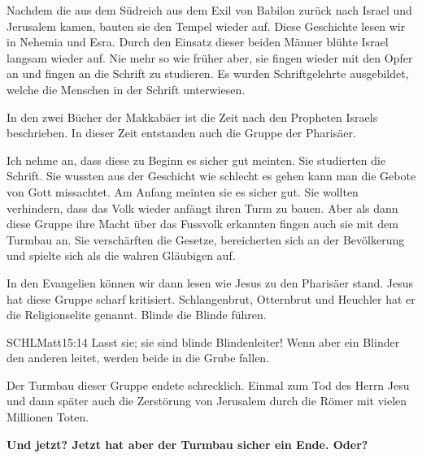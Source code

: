 \documentclass[14pt]{../../inc/mybib}
\newenvironment{block}[1][]{%
  \vspace{1.5em}%
  \noindent\textbf{#1}\par%
  \vspace{0.0em}%
}{%
  \vspace{1em}%
}
\begin{document}
\begin{block}
    Nachdem die aus dem Südreich aus dem Exil von Babilon zurück nach Israel und Jerusalem kamen, bauten sie den Tempel wieder auf. Diese Geschichte lesen wir in Nehemia und Esra. Durch den Einsatz dieser beiden Männer blühte Israel langsam wieder auf. Nie mehr so wie früher aber, sie fingen wieder mit den Opfer an und fingen an die Schrift zu studieren. Es wurden Schriftgelehrte ausgebildet, welche die Menschen in der Schrift unterwiesen. 
    
    In den zwei Bücher der Makkabäer ist die Zeit nach den Propheten Israels beschrieben. In dieser Zeit entstanden auch die Gruppe der Pharisäer.
    
    Ich nehme an, dass diese zu Beginn es sicher gut meinten. Sie studierten die Schrift. Sie wussten aus der Geschicht wie schlecht es gehen kann man die Gebote von Gott missachtet. Am Anfang meinten sie es sicher gut. Sie wollten verhindern, dass das Volk wieder anfängt ihren Turm zu bauen. Aber als dann diese Gruppe ihre Macht über das Fussvolk erkannten fingen auch sie mit dem Turmbau an. Sie verschärften die Gesetze, bereicherten sich an der Bevölkerung und spielte sich als die wahren Gläubigen auf.
    
    In den Evangelien können wir dann lesen wie Jesus zu den Pharisäer stand. Jesus hat diese Gruppe scharf kritisiert. Schlangenbrut, Otternbrut und Heuchler hat er die Religionselite genannt. Blinde die Blinde führen.
    \begin{bibelbox}{SCHL}{Matt}{15:14}
        Lasst sie; sie sind blinde Blindenleiter! Wenn aber ein Blinder den anderen leitet, werden beide in die Grube fallen.
    \end{bibelbox} 
    Der Turmbau dieser Gruppe endete schrecklich. Einmal zum Tod des Herrn Jesu und dann später auch die Zerstörung von Jerusalem durch die Römer mit vielen Millionen Toten. 
    
    \textbf{Und jetzt? Jetzt hat aber der Turmbau sicher ein Ende. Oder?}
\end{block}
\end{document}
